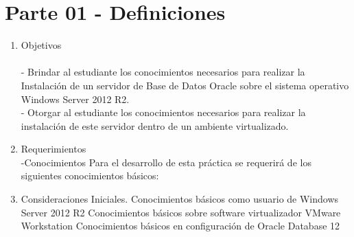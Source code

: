 \section{Parte 01 - Definiciones} 

\begin{enumerate}[1.]
	\item Objetivos
	\\\\- Brindar al estudiante los conocimientos necesarios para realizar la Instalación de un servidor de Base de Datos Oracle sobre el sistema operativo Windows Server 2012 R2.
	\\- Otorgar al estudiante los conocimientos necesarios para realizar la instalación de este servidor dentro de un ambiente virtualizado.\\
	\item Requerimientos
	\\-Conocimientos
	\subitem Para el desarrollo de esta práctica se requerirá de los siguientes conocimientos básicos:

	\item Consideraciones Iniciales.
	\subitem Conocimientos b\'asicos como usuario de Windows Server 2012 R2
	\subitem Conocimientos b\'asicos sobre software virtualizador VMware Workstation
	\subitem Conocimientos b\'asicos en configuración de Oracle Database 12
	
	

\end{enumerate} 
